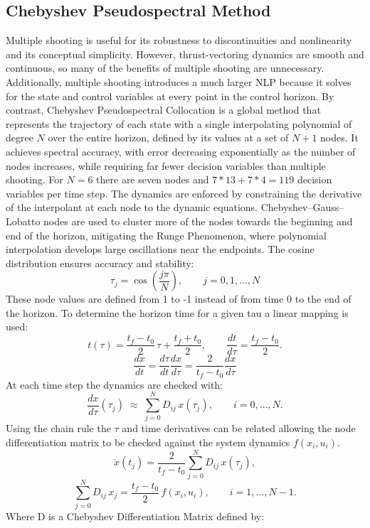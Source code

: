 \documentclass[]{article}
\begin{document}
\subsection*{Chebyshev Pseudospectral Method}
Multiple shooting is useful for its robustness to discontinuities and nonlinearity and its conceptual simplicity. However, thrust-vectoring dynamics are smooth and continuous, so many of the benefits of multiple shooting are unnecessary. Additionally, multiple shooting introduces a much larger NLP because it solves for the state and control variables at every point in the control horizon. By contrast, Chebyshev Pseudospectral Collocation is a global method that represents the trajectory of each state with a single interpolating polynomial of degree $N$ over the entire horizon, defined by its values at a set of $N+1$ nodes. It achieves spectral accuracy, with error decreasing exponentially as the number of nodes increases, while requiring far fewer decision variables than multiple shooting. For $N=6$ there are seven nodes and $7*13+7*4=119$ decision variables per time step. The dynamics are enforced by constraining the derivative of the interpolant at each node to the dynamic equations. Chebyshev–Gauss–Lobatto nodes are used to cluster more of the nodes towards the beginning and end of the horizon, mitigating the Runge Phenomenon, where polynomial interpolation develops large oscillations near the endpoints. The cosine distribution ensures accuracy and stability:
	\[
        \tau_j = \cos{(\frac{j\pi}{N})},\qquad j = 0,1,...,N
        \]
 These node values are defined from 1 to -1 instead of from time 0 to the end of the horizon. To determine the horizon time for a given tau a linear mapping is used:
         \[
        t(\tau) = \frac{t_f-t_0}{2}\,\tau + \frac{t_f+t_0}{2}, 
        \qquad 
        \frac{dt}{d\tau} = \frac{t_f-t_0}{2}.
        \]
        \[
        \frac{dx}{dt}=\frac{d\tau}{dt}\frac{dx}{d\tau}=\frac{2}{t_f-t_0}\frac{dx}{d\tau}
        \]
At each time step the dynamics are checked with:
        \[
        \frac{dx}{d\tau}(\tau_j) \;\approx\; \sum_{j=0}^N D_{ij}\,x(\tau_j), 
        \qquad i=0,\dots,N.
        \]
Using the chain rule the $\tau$ and time derivatives can be related allowing the node differentiation matrix to be checked against the system dynamics $f(x_i,u_i)$.
        \[
       \dot{x}(t_j)= \frac{2}{t_f-t_0}\sum_{j=0}^N D_{ij}\,x(\tau_j), 
        \]
        \[
        \sum_{j=0}^N D_{ij}\,x_j 
        = \frac{t_f-t_0}{2}\, f(x_i,u_i), 
        \qquad i=1,\dots,N-1.
        \]
Where D is a Chebyshev Differentiation Matrix defined by:
\end{document}
